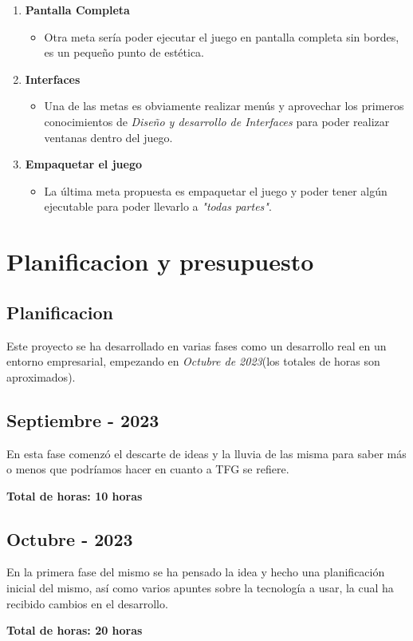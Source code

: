 \documentclass[a4paper]{article}
\begin{document}
\begin{enumerate}
    \item \textbf{Pantalla Completa}
          \begin{itemize}
              \item Otra meta sería poder ejecutar el juego en pantalla completa sin bordes, es un pequeño punto de estética.
          \end{itemize}

    \item \textbf{Interfaces}
          \begin{itemize}
              \item Una de las metas es obviamente realizar menús y aprovechar los primeros conocimientos de \textit{Diseño y desarrollo de Interfaces} para poder realizar ventanas dentro del juego.
          \end{itemize}

    \item \textbf{Empaquetar el juego}
          \begin{itemize}
              \item La última meta propuesta es empaquetar el juego y poder tener algún ejecutable para poder llevarlo a \textit{"todas partes"}.
          \end{itemize}
\end{enumerate}

\clearpage
\section{Planificacion y presupuesto}
\subsection{Planificacion}
Este proyecto se ha desarrollado en varias fases como un desarrollo real en un entorno empresarial, empezando en \textit{Octubre de 2023}(los totales de horas son aproximados).
\subsection{Septiembre - 2023}
En esta fase comenzó el descarte de ideas y la lluvia de las misma para saber más o menos que podríamos hacer en cuanto a TFG se refiere.
\begin{flushright}
    \bf Total de horas: 10 horas
\end{flushright}

\subsection{Octubre - 2023}
En la primera fase del mismo se ha pensado la idea y hecho una planificación inicial del mismo, así como varios apuntes sobre la tecnología a usar, la cual ha recibido cambios en el desarrollo.
\begin{flushright}
    \bf Total de horas: 20 horas
\end{flushright}
\end{document}

